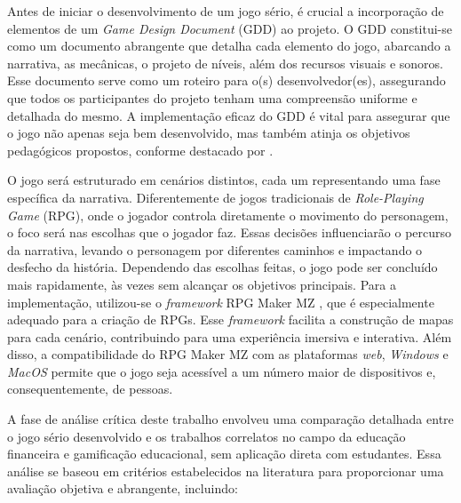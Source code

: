 Antes de iniciar o desenvolvimento de um jogo sério, é crucial a incorporação de elementos de um \textit{Game Design Document} (GDD) ao projeto. O GDD constitui-se como um documento abrangente que detalha cada elemento do jogo, abarcando a narrativa, as mecânicas, o projeto de níveis, além dos recursos visuais e sonoros. Esse documento serve como um roteiro para o(s) desenvolvedor(es), assegurando que todos os participantes do projeto tenham uma compreensão uniforme e detalhada do mesmo. A implementação eficaz do GDD é vital para assegurar que o jogo não apenas seja bem desenvolvido, mas também atinja os objetivos pedagógicos propostos, conforme destacado por \cite{arifudin2022gdd}.

O jogo será estruturado em cenários distintos, cada um representando uma fase específica da narrativa. Diferentemente de jogos tradicionais de \textit{Role-Playing Game} (RPG), onde o jogador controla diretamente o movimento do personagem, o foco será nas escolhas que o jogador faz. Essas decisões influenciarão o percurso da narrativa, levando o personagem por diferentes caminhos e impactando o desfecho da história. Dependendo das escolhas feitas, o jogo pode ser concluído mais rapidamente, às vezes sem alcançar os objetivos principais. Para a implementação, utilizou-se o \textit{framework} RPG Maker MZ \cite{RPGMakerMZ}, que é especialmente adequado para a criação de RPGs. Esse \textit{framework} facilita a construção de mapas para cada cenário, contribuindo para uma experiência imersiva e interativa. Além disso, a compatibilidade do RPG Maker MZ com as plataformas \textit{web}, \textit{Windows} e \textit{MacOS} permite que o jogo seja acessível a um número maior de dispositivos e, consequentemente, de pessoas.

A fase de análise crítica deste trabalho envolveu uma comparação detalhada entre o jogo sério desenvolvido e os trabalhos correlatos no campo da educação financeira e gamificação educacional, sem aplicação direta com estudantes. Essa análise se baseou em critérios estabelecidos na literatura para proporcionar uma avaliação objetiva e abrangente, incluindo:

